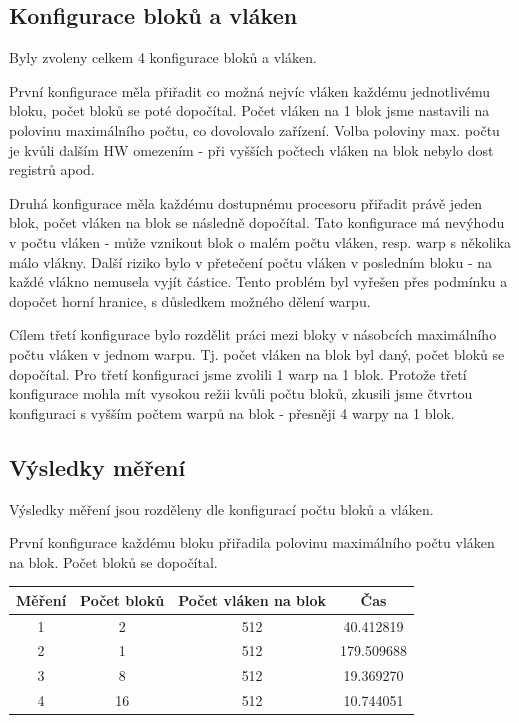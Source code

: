 \documentclass[12pt]{article}
\begin{document}
\subsection{Konfigurace bloků a vláken}
Byly zvoleny celkem 4 konfigurace bloků a vláken.

První konfigurace měla přiřadit co možná nejvíc vláken každému jednotlivému bloku, počet bloků se poté dopočítal.
Počet vláken na 1 blok jsme nastavili na polovinu maximálního počtu, co dovolovalo zařízení.
Volba poloviny max. počtu je kvůli dalším HW omezením - při vyšších počtech vláken na blok nebylo dost registrů apod.

Druhá konfigurace měla každému dostupnému procesoru přiřadit právě jeden blok, počet vláken na blok se následně dopo\-čítal.
Tato konfigurace má nevýhodu v počtu vláken - může vznikout blok o malém počtu vláken, resp. warp s několika málo vlákny.
Další riziko bylo v přetečení počtu vláken v posledním bloku - na každé vlákno nemusela vyjít částice.
Tento problém byl vyřešen přes podmínku a dopočet horní hranice, s důsledkem možného dělení warpu.

Cílem třetí konfigurace bylo rozdělit práci mezi bloky v násobcích maximálního počtu vláken v jednom warpu.
Tj. počet vláken na blok byl daný, počet bloků se dopočítal.
Pro třetí konfiguraci jsme zvolili 1 warp na 1 blok.
Protože třetí konfigurace mohla mít vysokou režii kvůli počtu bloků,
zkusili jsme čtvrtou konfiguraci s vyšším počtem warpů na blok - přesněji 4 warpy na 1 blok.

\subsection{Výsledky měření}
Výsledky měření jsou rozděleny dle konfigurací počtu bloků a vláken.

První konfigurace každému bloku přiřadila polovinu maximálního počtu vláken na blok. Počet bloků se dopočítal.
\begin{center}
\begin{tabular}{c | c | c | c}
\textbf{Měření} & \textbf{Počet bloků} & \textbf{Počet vláken na blok} & \textbf{Čas} \\ \hline \hline
1 & 2 & 512 & 40.412819 \\ \hline
2 & 1 & 512 & 179.509688 \\ \hline
3 & 8 & 512 & 19.369270 \\ \hline
4 & 16 & 512 & 10.744051 \\ \hline
\end{tabular}
\end{center}
\end{document}
